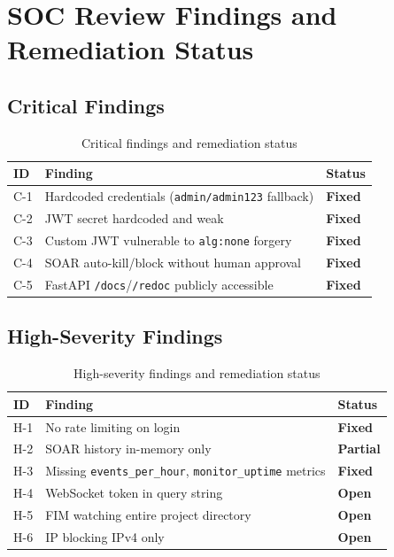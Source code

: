 \documentclass[12pt,a4paper]{article}
\begin{document}
\section{SOC Review Findings and Remediation Status}

\subsection{Critical Findings}

\begin{table}[H]
\centering
\begin{tabularx}{\linewidth}{lXl}
\toprule
\textbf{ID} & \textbf{Finding} & \textbf{Status} \\
\midrule
C-1 & Hardcoded credentials (\texttt{admin/admin123} fallback) & \textcolor{success}{\textbf{Fixed}} \\
C-2 & JWT secret hardcoded and weak & \textcolor{success}{\textbf{Fixed}} \\
C-3 & Custom JWT vulnerable to \texttt{alg:none} forgery & \textcolor{success}{\textbf{Fixed}} \\
C-4 & SOAR auto-kill/block without human approval & \textcolor{success}{\textbf{Fixed}} \\
C-5 & FastAPI \texttt{/docs}/\texttt{/redoc} publicly accessible & \textcolor{success}{\textbf{Fixed}} \\
\bottomrule
\end{tabularx}
\caption{Critical findings and remediation status}
\end{table}

\subsection{High-Severity Findings}

\begin{table}[H]
\centering
\begin{tabularx}{\linewidth}{lXl}
\toprule
\textbf{ID} & \textbf{Finding} & \textbf{Status} \\
\midrule
H-1 & No rate limiting on login & \textcolor{success}{\textbf{Fixed}} \\
H-2 & SOAR history in-memory only & \textcolor{warning}{\textbf{Partial}} \\
H-3 & Missing \texttt{events\_per\_hour}, \texttt{monitor\_uptime} metrics & \textcolor{success}{\textbf{Fixed}} \\
H-4 & WebSocket token in query string & \textcolor{warning}{\textbf{Open}} \\
H-5 & FIM watching entire project directory & \textcolor{warning}{\textbf{Open}} \\
H-6 & IP blocking IPv4 only & \textcolor{warning}{\textbf{Open}} \\
\bottomrule
\end{tabularx}
\caption{High-severity findings and remediation status}
\end{table}
\end{document}
